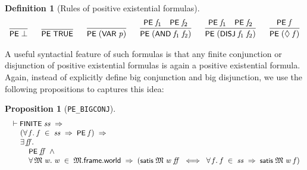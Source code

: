 \documentclass[letterpaper]{article}
\newtheorem{defn}{Definition}
\newtheorem{prop}{Proposition}
\renewcommand{\HOLConst}[1]{{\textsf{\upshape\small #1}}}
\renewcommand{\HOLinline}[1]{\ensuremath{#1}}
\newenvironment{holmath}{\begin{displaymath}\begin{array}{l}}{\end{array}\end{displaymath}\ignorespacesafterend}
\begin{document}
\begin{defn}[Rules of positive existential formulas]
\[
\begin{array}{c}
  \infer{\HOLinline{\HOLConst{PE}\;\HOLSymConst{\ensuremath{\bot}}}}{} \ \ \ \ \ 
  \infer{\HOLinline{\HOLConst{PE}\;\HOLConst{TRUE}}}{} \ \ \ \ \ 
  \infer{\HOLinline{\HOLConst{PE}\;(\HOLConst{VAR}\;\HOLFreeVar{p})}}{} \ \ \ \ \
  \infer{\HOLinline{\HOLConst{PE}\;(\HOLConst{AND}\;\HOLFreeVar{f\sb{\mathrm{1}}}\;\HOLFreeVar{f\sb{\mathrm{2}}})}}{\HOLinline{\HOLConst{PE}\;\HOLFreeVar{f\sb{\mathrm{1}}}}&\HOLinline{\HOLConst{PE}\;\HOLFreeVar{f\sb{\mathrm{2}}}}} \ \ \ \ \ 
  \infer{\HOLinline{\HOLConst{PE}\;(\HOLConst{DISJ}\;\HOLFreeVar{f\sb{\mathrm{1}}}\;\HOLFreeVar{f\sb{\mathrm{2}}})}}{\HOLinline{\HOLConst{PE}\;\HOLFreeVar{f\sb{\mathrm{1}}}}&\HOLinline{\HOLConst{PE}\;\HOLFreeVar{f\sb{\mathrm{2}}}}} \ \ \ \ \ 
  \infer{\HOLinline{\HOLConst{PE}\;(\HOLSymConst{\ensuremath{\Diamond}}\;\HOLFreeVar{f})}}{\HOLinline{\HOLConst{PE}\;\HOLFreeVar{f}}}
\end{array}
\]
\end{defn}
A useful syntactial feature of such formulas is that any finite conjunction or disjunction of positive existential formulas is again a positive existential formula. Again, instead of explicitly define big conjunction and big disjunction, we use the following propositions to captures this idea:
\begin{prop}[\texttt{PE_BIGCONJ}]
\begin{holmath}
  \ensuremath{\HOLTokenTurnstile}\HOLConst{FINITE}\;\HOLFreeVar{ss}\;\HOLSymConst{\HOLTokenImp{}}\\
\;\;\;\;\;(\HOLSymConst{\HOLTokenForall{}}\HOLBoundVar{f}.\;\HOLBoundVar{f}\;\HOLSymConst{\HOLTokenIn{}}\;\HOLFreeVar{ss}\;\HOLSymConst{\HOLTokenImp{}}\;\HOLConst{PE}\;\HOLBoundVar{f})\;\HOLSymConst{\HOLTokenImp{}}\\
\;\;\;\;\;\HOLSymConst{\HOLTokenExists{}}\HOLBoundVar{ff}.\\
\;\;\;\;\;\;\;\;\;\HOLConst{PE}\;\HOLBoundVar{ff}\;\HOLSymConst{\HOLTokenConj{}}\\
\;\;\;\;\;\;\;\;\;\HOLSymConst{\HOLTokenForall{}}\HOLBoundVar{\ensuremath{\mathfrak{M}}}\;\HOLBoundVar{w}.\;\HOLBoundVar{w}\;\HOLSymConst{\HOLTokenIn{}}\;\HOLBoundVar{\ensuremath{\mathfrak{M}}}.\HOLFieldName{frame}.\HOLFieldName{world}\;\HOLSymConst{\HOLTokenImp{}}\;(\HOLConst{satis}\;\HOLBoundVar{\ensuremath{\mathfrak{M}}}\;\HOLBoundVar{w}\;\HOLBoundVar{ff}\;\HOLSymConst{\HOLTokenEquiv{}}\;\HOLSymConst{\HOLTokenForall{}}\HOLBoundVar{f}.\;\HOLBoundVar{f}\;\HOLSymConst{\HOLTokenIn{}}\;\HOLFreeVar{ss}\;\HOLSymConst{\HOLTokenImp{}}\;\HOLConst{satis}\;\HOLBoundVar{\ensuremath{\mathfrak{M}}}\;\HOLBoundVar{w}\;\HOLBoundVar{f})
\end{holmath}
\end{prop}
\end{document}
